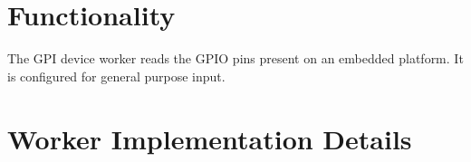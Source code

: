 \def\name{\comp}
\def\workertype{}
\def\version{\ocpiversion}
\def\releasedate{11/2019}
\def\componentlibrary{ocpi.assets.devices}
\def\workers{\comp{}.hdl}
\def\testedplatforms{matchstiq\_{}z1, xsim}

	
\section*{Functionality}
\begin{flushleft}
The GPI device worker reads the GPIO pins present on an embedded platform. It is configured for general purpose input.

\end{flushleft}

\section*{Worker Implementation Details}
